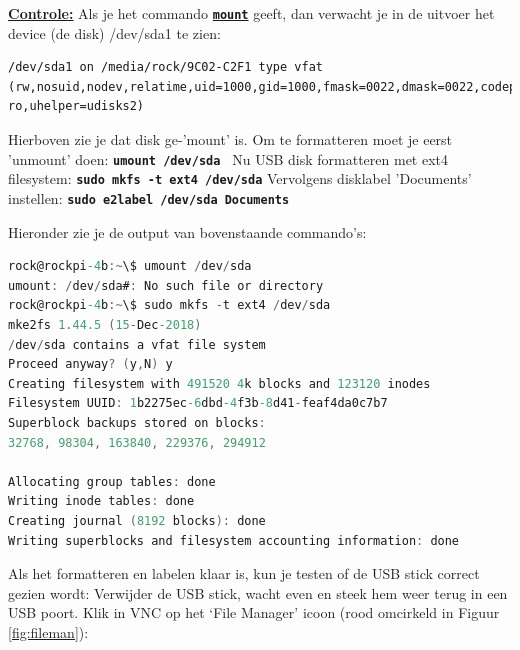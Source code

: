 \underline{\textbf{Controle:}}\newline 
Als je het commando \href{https://www.techrepublic.com/article/linux-101-what-is-the-mount-command-and-how-do-you-use-it/}{\textbf{\texttt{mount}}} geeft, dan verwacht je in de uitvoer het device (de disk) /dev/sda1 te zien: %
\begin{lstlisting}
/dev/sda1 on /media/rock/9C02-C2F1 type vfat (rw,nosuid,nodev,relatime,uid=1000,gid=1000,fmask=0022,dmask=0022,codepage=936,iocharset=utf8,shortname=mixed,showexec,utf8,flush,errors=remount-ro,uhelper=udisks2)
\end{lstlisting}

Hierboven zie je dat disk ge-'mount' is. Om te formatteren moet je eerst 'unmount' doen:\newline
\textbf{\texttt{umount /dev/sda }}\newline
Nu USB disk formatteren met ext4 filesystem:\newline
\textbf{\texttt{sudo mkfs -t ext4 /dev/sda}}\newline
Vervolgens disklabel 'Documents' instellen:\newline
\textbf{\texttt{sudo e2label /dev/sda Documents}}

Hieronder zie je de output van bovenstaande commando's:
	
\begin{lstlisting}[language=C]   % Gert: Is het niet, maar hiermee doet hij geen speciale opmaak
rock@rockpi-4b:~\$ umount /dev/sda
umount: /dev/sda#: No such file or directory
rock@rockpi-4b:~\$ sudo mkfs -t ext4 /dev/sda
mke2fs 1.44.5 (15-Dec-2018)
/dev/sda contains a vfat file system
Proceed anyway? (y,N) y
Creating filesystem with 491520 4k blocks and 123120 inodes
Filesystem UUID: 1b2275ec-6dbd-4f3b-8d41-feaf4da0c7b7
Superblock backups stored on blocks:
32768, 98304, 163840, 229376, 294912

Allocating group tables: done
Writing inode tables: done
Creating journal (8192 blocks): done
Writing superblocks and filesystem accounting information: done
\end{lstlisting}

Als het formatteren en labelen klaar is, kun je testen of de USB stick correct gezien wordt:\newline
Verwijder de USB stick, wacht even en steek hem weer terug in een USB poort.\newline
Klik in VNC op het ‘File Manager’ icoon (rood omcirkeld in Figuur \ref{fig:fileman}):

